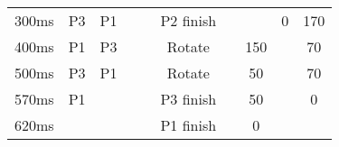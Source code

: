 \begin{frame}
\begin{table}[]
\begin{adjustbox}{width=0.8\textwidth}
\begin{tabular}{c|cccc|c|cccc}
                \pause 300ms                            & P3                                     & P1              &                 &                 & P2 finish      &             &             & \alert{0}   & 170         \\
                \pause 400ms                            & \alert{P1}                             & \alert{P3}      &                 &                 & \alert{Rotate} &             & 150         &             & \alert{70}  \\
                \pause 500ms                            & \alert{P3}                             & \alert{P1}      &                 &                 & \alert{Rotate} &             & \alert{50}  &             & 70          \\
                \pause 570ms                            & P1                                     &                 &                 &                 & P3 finish      &             & 50          &             & \alert{0}   \\
                \pause 620ms                            &                                        &                 &                 &                 & P1 finish      &             & \alert{0}   &             &
            \end{tabular}
        \end{adjustbox}
    \end{table}

\end{frame}
